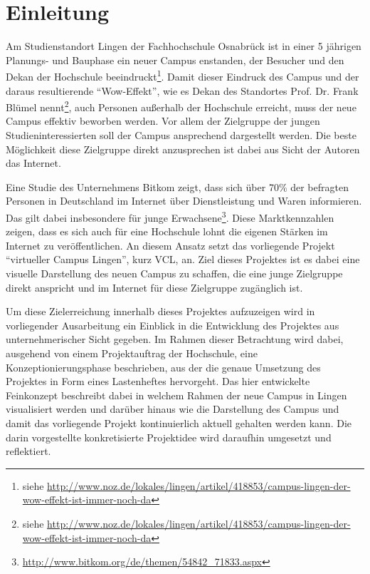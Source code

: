 \section{Einleitung}
\label{sec:Einleitung}

Am Studienstandort Lingen der Fachhochschule Osnabrück ist in einer 5 jährigen Planungs- und Bauphase
ein neuer Campus enstanden, der Besucher und den Dekan der Hochschule beeindruckt\footnote{siehe \url{http://www.noz.de/lokales/lingen/artikel/418853/campus-lingen-der-wow-effekt-ist-immer-noch-da}}.
Damit dieser Eindruck des Campus und der daraus resultierende "`Wow-Effekt"', wie es Dekan des Standortes 
Prof. Dr. Frank Blümel nennt\footnote{siehe \url{http://www.noz.de/lokales/lingen/artikel/418853/campus-lingen-der-wow-effekt-ist-immer-noch-da}}, auch Personen außerhalb der Hochschule erreicht, muss der neue Campus
effektiv beworben werden. Vor allem der Zielgruppe der jungen Studieninteressierten soll
der Campus ansprechend dargestellt werden. Die beste Möglichkeit diese Zielgruppe direkt anzusprechen
ist dabei aus Sicht der Autoren das Internet.

Eine Studie des Unternehmens Bitkom zeigt, dass sich über 70\% der befragten Personen in Deutschland
im Internet über Dienstleistung und Waren informieren. Das gilt dabei insbesondere für junge
Erwachsene\footnote{\url{http://www.bitkom.org/de/themen/54842_71833.aspx}}.
Diese Marktkennzahlen zeigen, dass es sich auch für eine Hochschule lohnt die eigenen
Stärken im Internet zu veröffentlichen. An diesem Ansatz setzt das vorliegende Projekt
"`virtueller Campus Lingen"', kurz VCL, an. Ziel dieses Projektes ist es dabei
eine visuelle Darstellung des neuen Campus zu schaffen, die eine junge Zielgruppe direkt anspricht
und im Internet für diese Zielgruppe zugänglich ist.

Um diese Zielerreichung innerhalb dieses Projektes aufzuzeigen wird in vorliegender Ausarbeitung
ein Einblick in die Entwicklung des Projektes aus unternehmerischer Sicht gegeben.
Im Rahmen dieser Betrachtung wird dabei, ausgehend von einem Projektauftrag der Hochschule,
eine Konzeptionierungsphase beschrieben, aus der die genaue Umsetzung des Projektes in Form
eines Lastenheftes hervorgeht. Das hier entwickelte Feinkonzept beschreibt dabei
in welchem Rahmen der neue Campus in Lingen visualisiert werden und darüber hinaus
wie die Darstellung des Campus und damit das vorliegende Projekt kontinuierlich aktuell
gehalten werden kann. Die darin vorgestellte konkretisierte Projektidee wird 
daraufhin umgesetzt und reflektiert.

